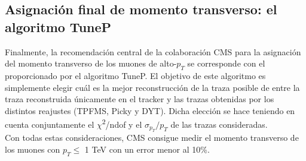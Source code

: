 \subsection{Asignaci\'on final de momento transverso: el algoritmo TuneP}\label{sec:TuneP}

Finalmente, la recomendaci\'on central de la colaboraci\'on CMS para la asignaci\'on del momento transverso de los muones de alto-$p_{T}$ se corresponde con el proporcionado por el algoritmo TuneP. El objetivo de este algoritmo es simplemente elegir cu\'al es la mejor reconstrucci\'on de la traza posible de entre la traza reconstruida \'unicamente en el tracker y las trazas obtenidas por los distintos reajustes (TPFMS, Picky y DYT). Dicha elecci\'on se hace teniendo en cuenta conjuntamente el $\chi$\textsuperscript{2}/ndof y el $\sigma_{p_{T}}/p_{T}$ de las trazas consideradas. \\

Con todas estas consideraciones, CMS consigue medir el momento transverso de los muones con $p_{T} \leq$ 1 TeV con un error menor al 10\%.
